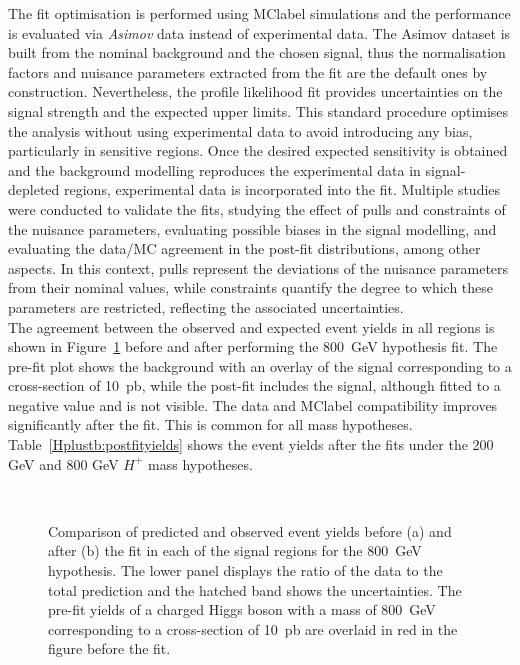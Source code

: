 The fit optimisation is performed using \acrshort{MClabel} simulations and the performance is evaluated via \textit{Asimov} data instead of experimental data. The Asimov dataset is built from the nominal background and the chosen signal, thus the normalisation factors and nuisance parameters extracted from the fit are the default ones by construction. Nevertheless, the profile likelihood fit provides uncertainties on the signal strength and the expected upper limits. This standard procedure optimises the analysis without using experimental data to avoid introducing any bias, particularly in sensitive regions. Once the desired expected sensitivity is obtained and the background modelling reproduces the experimental data in signal-depleted regions, experimental data is incorporated into the fit. Multiple studies were conducted to validate the fits, studying the effect of pulls and constraints of the nuisance parameters, evaluating possible biases in the signal modelling, and evaluating the data/MC agreement in the post-fit distributions, among other aspects. In this context, pulls represent the deviations of the nuisance parameters from their nominal values, while constraints quantify the degree to which these parameters are restricted, reflecting the associated uncertainties.\\

The agreement between the observed and expected event yields in all regions is shown in Figure~\ref{Hplustb:Summaryyieldsplot800} before and after performing the 800~GeV hypothesis fit. The pre-fit plot shows the background with an overlay of the signal corresponding to a cross-section of 10~pb, while the post-fit includes the signal, although fitted to a negative value and is not visible. The data and \acrshort{MClabel} compatibility improves significantly after the fit. This is common for all mass hypotheses. Table~\ref{Hplustb:postfityields} shows the event yields after the fits under the 200 GeV and 800 GeV $H^+$ mass hypotheses.\\

\begin{figure}[htb]
    \RawFloats
    \centering
    \\
    \caption{Comparison of predicted and observed event yields before (a) and after (b) the fit in each of the signal regions for the 800~GeV hypothesis. The lower panel displays the ratio of the data to the total prediction and the hatched band shows the uncertainties. The pre-fit yields of a charged Higgs boson with a mass of 800~GeV corresponding to a cross-section of 10~pb are overlaid in red in the figure before the fit.}
    \label{Hplustb:Summaryyieldsplot800}
\end{figure}


